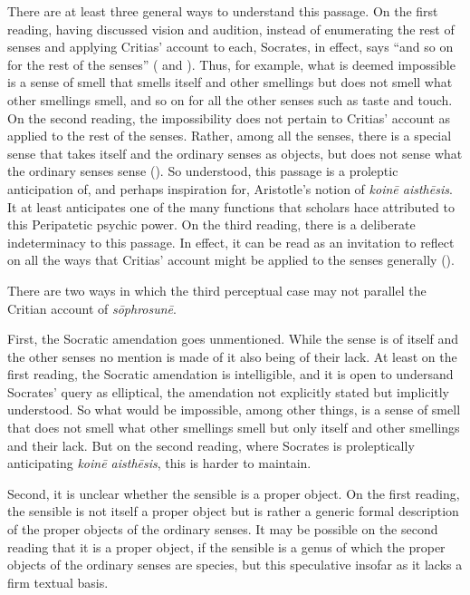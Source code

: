 There are at least three general ways to understand this passage. On the first reading, having discussed vision and audition, instead of enumerating the rest of senses and applying Critias' account to each, Socrates, in effect, says ``and so on for the rest of the senses'' (\citealt[113–4]{Bloch:1973aa} and \citealt[89]{Schmid:1998aa}). Thus, for example, what is deemed impossible is a sense of smell that smells itself and other smellings but does not smell what other smellings smell, and so on for all the other senses such as taste and touch. On the second reading, the impossibility does not pertain to Critias' account as applied to the rest of the senses. Rather, among all the senses, there is a special sense that takes itself and the ordinary senses as objects, but does not sense what the ordinary senses sense (\citealt[214–5]{Tuozzo:2011aa}). So understood, this passage is a proleptic anticipation of, and perhaps inspiration for, Aristotle's notion of \emph{koinē aisthēsis}. It at least anticipates one of the many functions that scholars hace attributed to this Peripatetic psychic power. On the third reading, there is a deliberate indeterminacy to this passage. In effect, it can be read as an invitation to reflect on all the ways that Critias' account might be applied to the senses generally (\citealt[202]{Tsouna:2022aa}).

There are two ways in which the third perceptual case may not parallel the Critian account of \emph{sōphrosunē}.

First, the Socratic amendation goes unmentioned. While the sense is of itself and the other senses no mention is made of it also being of their lack. At least on the first reading, the Socratic amendation is intelligible, and it is open to undersand Socrates' query as elliptical, the amendation not explicitly stated but implicitly understood. So what would be impossible, among other things, is a sense of smell that does not smell what other smellings smell but only itself and other smellings and their lack. But on the second reading, where Socrates is proleptically anticipating \emph{koinē aisthēsis}, this is harder to maintain.

Second, it is unclear whether the sensible is a proper object. On the first reading, the sensible is not itself a proper object but is rather a generic formal description of the proper objects of the ordinary senses. It may be possible on the second reading that it is a proper object, if the sensible is a genus of which the proper objects of the ordinary senses are species, but this speculative insofar as it lacks a firm textual basis.

